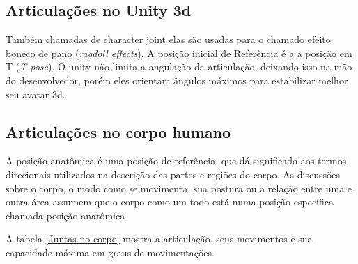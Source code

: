 
\subsection{Articulações no Unity 3d}
\label{sec:Articulacoes no Unity 3d}
  Também chamadas de character joint elas são usadas para o chamado efeito
boneco de pano (\textit{ragdoll effects}). A posição inicial de Referência é a
a posição em T (\textit{T pose}). O unity não limita a angulação da articulação,
deixando isso na mão do desenvolvedor, porém eles orientam ângulos máximos
para estabilizar melhor seu avatar 3d.\cite{unity3dManual}

\subsection{Articulações no corpo humano}
\label{sec:Juntas no corpo humano}
 A posição anatômica é uma posição de referência, que dá significado aos termos
 direcionais utilizados na descrição das partes e regiões do corpo. As discussões
 sobre o corpo, o modo como se movimenta, sua postura ou a relação entre uma e
outra área assumem que o corpo como um todo está numa posição específica chamada
 posição anatômica

  A tabela \ref{Juntas no corpo} mostra a articulação, seus movimentos e sua capacidade máxima em
graus de movimentações.


